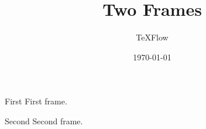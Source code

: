 \documentclass[aspectratio=43]{beamer}
\title{Two Frames}
\author{TeXFlow}
\date{\today}
\begin{document}
\begin{frame}{First}
First frame.
\end{frame}

\begin{frame}{Second}
Second frame.
\end{frame}
\end{document}
